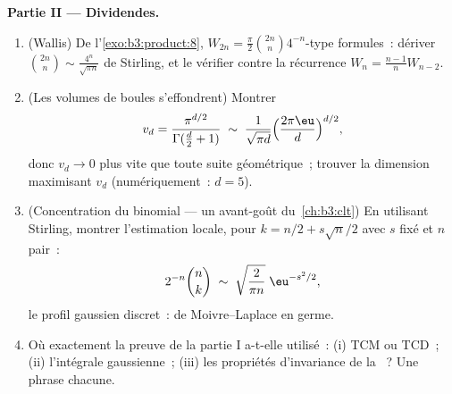 \begin{problem}
\medskip
\noindent\textbf{Partie II --- Dividendes.}
\begin{enumerate}[resume]
  \item (Wallis) De l'\cref{exo:b3:product:8}, $W_{2n} =
        \frac\pi2\binom{2n}n4^{-n}$-type formules~: dériver
        $\binom{2n}{n} \sim \frac{4^n}{\sqrt{\pi n}}$ de
        Stirling, et le vérifier contre la récurrence $W_{n}
        = \frac{n-1}nW_{n-2}$.
  \item (Les volumes de boules s'effondrent) Montrer
        \[
        v_d = \frac{\pi^{d/2}}{\Gamma(\frac d2 + 1)}
        \;\sim\; \frac{1}{\sqrt{\pi d}}
        \Bigl(\frac{2\pi\eu}{d}\Bigr)^{d/2},
        \]
        donc $v_d \to 0$ plus vite que toute suite
        géométrique~; trouver la dimension maximisant $v_d$
        (numériquement~: $d = 5$).
  \item (Concentration du binomial --- un avant-goût
        du~\cref{ch:b3:clt}) En utilisant Stirling, montrer
        l'estimation locale, pour $k = n/2 + s\sqrt n/2$
        avec $s$ fixé et $n$ pair~:
        \[
        2^{-n}\binom{n}{k} \;\sim\;
        \sqrt{\frac{2}{\pi n}}\;\eu^{-s^2/2},
        \]
        le profil gaussien discret~: de Moivre--Laplace en
        germe.
  \item Où exactement la preuve de la partie I a-t-elle
        utilisé~: (i) TCM ou TCD~; (ii) l'intégrale
        gaussienne~; (iii) les propriétés d'invariance de
        la ~? Une phrase chacune.
\end{enumerate}


\end{problem}
